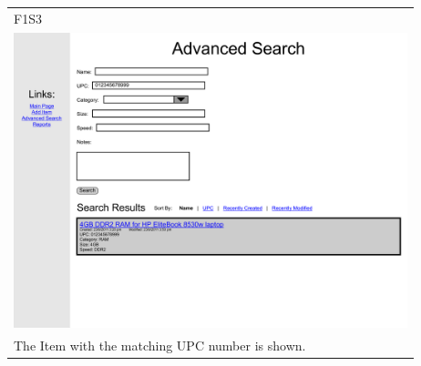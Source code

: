 \documentclass{article}
\begin{document}
~\\
~\\
\begin{tabular}{ p{4.5in} }
F1S3\\
\includegraphics[keepaspectratio, width=4.5in]{advancedSearchF1S3.pdf} \\
The Item with the matching UPC number is shown.
\end{tabular}
\end{document}
